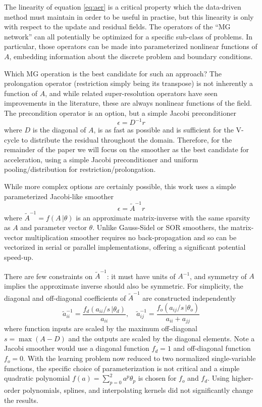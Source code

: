 \documentclass[review]{elsarticle}
\begin{document}
The linearity of equation \ref{eq:aer} is a critical property which the data-driven method must maintain in order to be useful in practise, but this linearity is only with respect to the update and residual fields. The operators of the ``MG network'' can all potentially be optimized for a specific sub-class of problems. In particular, those operators can be made into parameterized nonlinear functions of $A$, embedding information about the discrete problem and boundary conditions. 

Which MG operation is the best candidate for such an approach? The prolongation operator (restriction simply being its transpose) is not inherently a function of $A$, and while related super-resolution operators have seen improvements in the literature, these are always nonlinear functions of the field. The precondition operator is an option, but a simple Jacobi preconditioner
\begin{equation}
    \epsilon = D^{-1}r
\end{equation}
where $D$ is the diagonal of $A$, is as fast as possible and is sufficient for the V-cycle to distribute the residual throughout the domain. Therefore, for the remainder of the paper we will focus on the smoother as the best candidate for acceleration, using a simple Jacobi preconditioner and uniform pooling/distribution for restriction/prolongation.

While more complex options are certainly possible, this work uses a simple parameterized Jacobi-like smoother
\begin{equation}
    \epsilon = \tilde A^{-1}r
\end{equation}
where $\tilde A^{-1}=f(A\,|\theta)$ is an approximate matrix-inverse with the same sparsity as $A$ and parameter vector $\theta$. 
Unlike Gauss-Sidel or SOR smoothers, the matrix-vector multiplication smoother requires no back-propagation and so can be vectorized in serial or parallel implementations, offering a significant potential speed-up.

There are few constraints on $\tilde A^{-1}$: it must have units of $A^{-1}$, and symmetry of $A$ implies the approximate inverse should also be symmetric. For simplicity, the diagonal and off-diagonal coefficients of $\tilde A^{-1}$ are constructed independently 
\begin{equation}
    \tilde a^{-1}_{ii} = \frac{f_d(a_{ii}/s\,|\theta_d)}{a_{ii}} , \quad
    \tilde a^{-1}_{ij} = \frac{f_o(a_{ij}/s\,|\theta_o)}{a_{ii}+a_{jj}}
\end{equation}
where function inputs are scaled by the maximum off-diagonal $s=\max(A-D)$ and the outputs are scaled by the diagonal elements. Note a Jacobi smoother would use a diagonal function $f_d=1$ and off-diagonal function $f_o=0$. With the learning problem now reduced to two normalized single-variable functions, the specific choice of parameterization is not critical and a simple quadratic polynomial $f(a) = \sum_{p=0}^2 a^p \theta_p$ is chosen for $f_o$ and $f_d$. Using higher-order polynomials, splines, and interpolating kernels did not significantly change the results.
\end{document}
